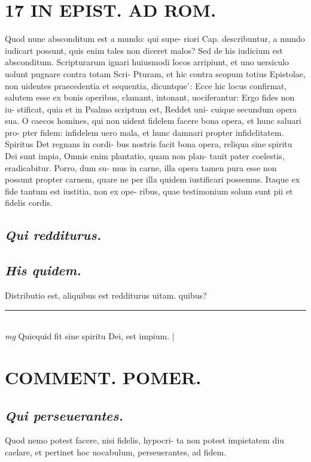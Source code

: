 \documentclass{article}
\begin{document}
\begin{pages}
\section*{17 IN EPIST. AD ROM.  }
\marginpar{[ p.]}\pstart Quod nunc absconditum est a mundo: qui supe- riori Cap. describuntur, a mundo iudicart possunt, quis enim tales non diceret malos? Sed de his iudicium est absconditum.   \pend\pstart Scripturarum ignari huiusmodi locos arripiunt, et uno uersiculo uolunt pugnare contra totam Scri- Pturam, et hic contra scopum totius Epistolae, non uidentes praecedentia et sequentia, dicuntque ́: Ecce hic locus confirmat, salutem esse ex bonis operibus, clamant, intonant, uociferantur: Ergo fides non iu- stificat, quia et in Psalmo scriptum est, Reddet uni- cuique secundum opera sua. O caecos homines, qui non uident fidelem facere bona opera, et hunc saluari pro- pter fidem: infidelem uero mala, et hunc damnari propter infidelitatem. Spiritus Det regnans in cordi- bus nostris facit bona opera, reliqua sine spiritu Dei sunt impia, Omnis enim plantatio, quam non plan- tauit pater coelestis, eradicabitur. Porro, dum su- mus in carne, illa opera tamen pura esse non possunt propter carnem, quare ne per illa quidem iustificari possemus. Itaque ex fide tantum est iustitia, non ex ope- ribus, quae testimonium solum sunt pii et fidelis cordis.   \pend
{}
{}
\subsection*{\textit{Qui redditurus. }}
{}
\subsection*{\textit{His quidem. }}\pstart Distributio est, aliquibus est redditurus uitam.  quibus?  \pend\pstart  \pend
\vspace{0.5cm}\noindent
\vspace{0.2cm}\rule{1cm}{0.2pt}\\ 
\hspace{0.2cm}\textit{mg}
\footnotesize Quicquid fit sine spiritu Dei, est impium. 
\normalsize| 
\section*{COMMENT. POMER.  }
{}
\subsection*{\textit{Qui perseuerantes. }}\pstart Quod nemo potest facere, nisi fidelis, hypocri- ta non potest impietatem diu caelare, et pertinet hoc uocabulum, perseuerantes, ad fidem.   \pend
{}
{}

\end{pages}
\end{document}
